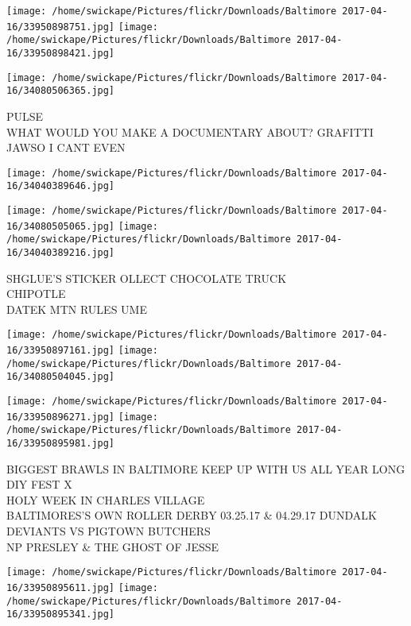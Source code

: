\documentclass[10pt,letterpaper]{article}
\begin{document}
\texttt{[image: /home/swickape/Pictures/flickr/Downloads/Baltimore 2017-04-16/33950898751.jpg]}
\texttt{[image: /home/swickape/Pictures/flickr/Downloads/Baltimore 2017-04-16/33950898421.jpg]}

\texttt{[image: /home/swickape/Pictures/flickr/Downloads/Baltimore 2017-04-16/34080506365.jpg]}

PULSE\\
WHAT WOULD YOU MAKE A DOCUMENTARY ABOUT?  GRAFITTI\\
JAWSO I CANT EVEN\\
\pagebreak

\texttt{[image: /home/swickape/Pictures/flickr/Downloads/Baltimore 2017-04-16/34040389646.jpg]}

\vspace{0.25in}
\texttt{[image: /home/swickape/Pictures/flickr/Downloads/Baltimore 2017-04-16/34080505065.jpg]}
\texttt{[image: /home/swickape/Pictures/flickr/Downloads/Baltimore 2017-04-16/34040389216.jpg]}

SHGLUE'S STICKER OLLECT CHOCOLATE TRUCK\\
CHIPOTLE\\
DATEK MTN RULES UME\\
\pagebreak

\texttt{[image: /home/swickape/Pictures/flickr/Downloads/Baltimore 2017-04-16/33950897161.jpg]}
\texttt{[image: /home/swickape/Pictures/flickr/Downloads/Baltimore 2017-04-16/34080504045.jpg]}

\texttt{[image: /home/swickape/Pictures/flickr/Downloads/Baltimore 2017-04-16/33950896271.jpg]}
\texttt{[image: /home/swickape/Pictures/flickr/Downloads/Baltimore 2017-04-16/33950895981.jpg]}

BIGGEST BRAWLS IN BALTIMORE KEEP UP WITH US ALL YEAR LONG DIY FEST X\\
HOLY WEEK IN CHARLES VILLAGE\\
BALTIMORES'S OWN ROLLER DERBY 03.25.17 \& 04.29.17 DUNDALK DEVIANTS VS PIGTOWN BUTCHERS\\
NP PRESLEY \& THE GHOST OF JESSE\\
\pagebreak

\texttt{[image: /home/swickape/Pictures/flickr/Downloads/Baltimore 2017-04-16/33950895611.jpg]}
\texttt{[image: /home/swickape/Pictures/flickr/Downloads/Baltimore 2017-04-16/33950895341.jpg]}
\end{document}
